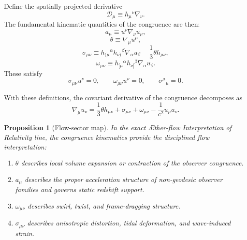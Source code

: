 \documentclass[11pt]{article}
\newcommand{\Aflow}{\AE{}ther-flow}
\newcommand{\TheoryName}{\Aflow{} Interpretation of Relativity}
\newcommand{\Proj}{\mathcal{D}}
\newtheorem{proposition}{Proposition}
\begin{document}
Define the spatially projected derivative
\begin{equation}
\Proj_\mu \equiv h_\mu{}^\nu \nabla_\nu.
\label{eq:projectedderivative}
\end{equation}
The fundamental kinematic quantities of the congruence are then:
\begin{equation}
a_\mu \equiv u^\nu \nabla_\nu u_\mu,
\label{eq:acceleration}
\end{equation}
\begin{equation}
\theta \equiv \nabla_\mu u^\mu,
\label{eq:expansion}
\end{equation}
\begin{equation}
\sigma_{\mu\nu}
\equiv
h_{(\mu}{}^\alpha h_{\nu)}{}^\beta \nabla_\alpha u_\beta
-\frac{1}{3}\theta h_{\mu\nu},
\label{eq:shear}
\end{equation}
\begin{equation}
\omega_{\mu\nu}
\equiv
h_{[\mu}{}^\alpha h_{\nu]}{}^\beta \nabla_\alpha u_\beta.
\label{eq:vorticity}
\end{equation}
These satisfy
\begin{equation}
\sigma_{\mu\nu}u^\nu = 0,
\qquad
\omega_{\mu\nu}u^\nu = 0,
\qquad
\sigma^\mu{}_\mu = 0.
\label{eq:kinematicprops}
\end{equation}

With these definitions, the covariant derivative of the congruence decomposes as
\begin{equation}
\nabla_\mu u_\nu
=
\frac{1}{3}\theta h_{\mu\nu}
+
\sigma_{\mu\nu}
+
\omega_{\mu\nu}
-\frac{1}{c^2}u_\mu a_\nu.
\label{eq:flowdecomp}
\end{equation}

\begin{proposition}[Flow-sector map]
In the exact \TheoryName{} line, the congruence kinematics provide the disciplined flow interpretation:
\begin{enumerate}
    \item \(\theta\) describes local volume expansion or contraction of the observer congruence.
    \item \(a_\mu\) describes the proper acceleration structure of non-geodesic observer families and governs static redshift support.
    \item \(\omega_{\mu\nu}\) describes swirl, twist, and frame-dragging structure.
    \item \(\sigma_{\mu\nu}\) describes anisotropic distortion, tidal deformation, and wave-induced strain.
\end{enumerate}
\end{proposition}
\end{document}
